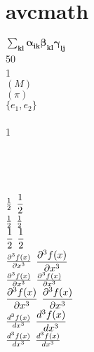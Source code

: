 \newpage
\section*{avcmath}\indent

$\bm{\sum_{kl} \alpha_{ik}\beta_{kl}\gamma_{lj}}$ \\

50\eth \\

1\ird \\

\tr$(M)$ \\

\sgn$(\pi)$ \\

\spn$\{e_1,e_2\}$ \\

\bs \\

1\ird {}\ird \\

 \\

 \\

 \\

 \\

$\textstyle \frac {1}{2}$ $\displaystyle \frac {1}{2}$ \\

$\textstyle \tfrac{1}{2}$ $\displaystyle \tfrac{1}{2}$ \\

$\textstyle \dfrac{1}{2}$ $\displaystyle \dfrac{1}{2}$ \\

$\textstyle \frac {\partial^3f(x)}{\partial x^3}$ $\displaystyle \frac {\partial^3f(x)}{\partial x^3}$ \\

$\textstyle \tfrac{\partial^3f(x)}{\partial x^3}$ $\displaystyle \tfrac{\partial^3f(x)}{\partial x^3}$ \\

$\textstyle \dfrac{\partial^3f(x)}{\partial x^3}$ $\displaystyle \dfrac{\partial^3f(x)}{\partial x^3}$ \\

$\textstyle \frac {d ^3f(x)}{d x^3}$ $\displaystyle \frac {d ^3f(x)}{d x^3}$ \\

$\textstyle \tfrac{d ^3f(x)}{d x^3}$ $\displaystyle \tfrac{d ^3f(x)}{d x^3}$ \\

